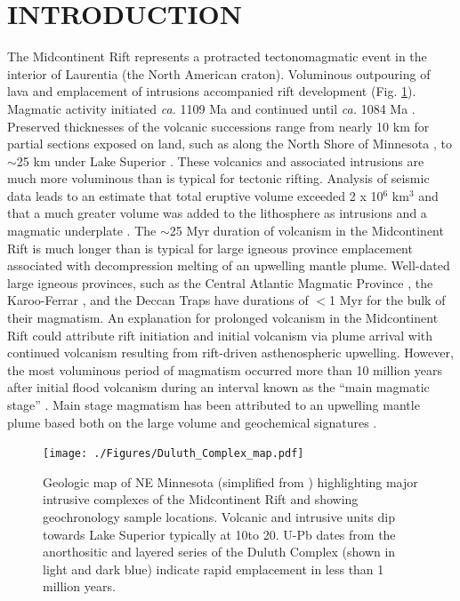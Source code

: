 \documentclass[11pt,letterpaper]{article}
\begin{document}
\section*{INTRODUCTION}

The Midcontinent Rift represents a protracted tectonomagmatic event in the interior of Laurentia (the North American craton). Voluminous outpouring of lava and emplacement of intrusions accompanied rift development (Fig. \ref{fig:map}). Magmatic activity initiated \textit{ca.} 1109 Ma and continued until \textit{ca.} 1084 Ma \citep{Swanson-Hysell2019a}. Preserved thicknesses of the volcanic successions range from nearly 10 km for partial sections exposed on land, such as along the North Shore of Minnesota \citep{Green2011a}, to $\sim$25 km under Lake Superior \citep{Cannon1992b}. These volcanics and associated intrusions are much more voluminous than is typical for tectonic rifting. Analysis of seismic data leads to an estimate that total eruptive volume exceeded 2 x 10$^6$ km$^3$ and that a much greater volume was added to the lithosphere as intrusions and a magmatic underplate \citep{Cannon1992b}. The $\sim$25 Myr duration of volcanism in the Midcontinent Rift is much longer than is typical for large igneous province emplacement associated with decompression melting of an upwelling mantle plume. Well-dated large igneous provinces, such as the Central Atlantic Magmatic Province \citep{Blackburn2013a}, the Karoo-Ferrar \citep{Burgess2015a}, and the Deccan Traps \citep{Schoene2019a, Sprain2019a} have durations of $<$1 Myr for the bulk of their magmatism. An explanation for prolonged volcanism in the Midcontinent Rift could attribute rift initiation and initial volcanism via plume arrival with continued volcanism resulting from rift-driven asthenospheric upwelling. However, the most voluminous period of magmatism occurred more than 10 million years after initial flood volcanism during an interval known as the ``main magmatic stage'' \citep{Vervoort2007a}. Main stage magmatism has been attributed to an upwelling mantle plume based both on the large volume and geochemical signatures \citep{Nicholson1990a, White1995a}.

\begin{figure}[!ht]
\noindent\texttt{[image: ./Figures/Duluth\_Complex\_map.pdf]}
\centering
\caption{\small{Geologic map of NE Minnesota (simplified from \citealp{Jirsa2011a}) highlighting major intrusive complexes of the Midcontinent Rift and showing geochronology sample locations. Volcanic and intrusive units dip towards Lake Superior typically at 10\textdegree to 20\textdegree. U-Pb dates from the anorthositic and layered series of the Duluth Complex (shown in light and dark blue) indicate rapid emplacement in less than 1 million years.}}
\label{fig:map}
\end{figure}
\end{document}
